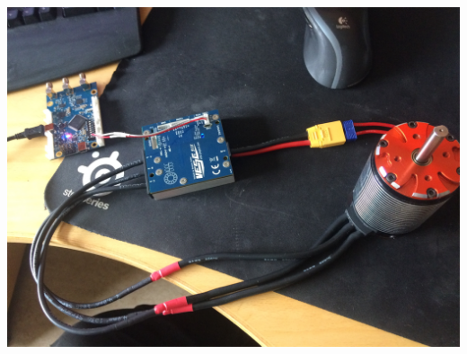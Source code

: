\documentclass[12pt]{article} %
\begin{document}
\begin{minipage}{0.33\textwidth}
  \noindent \includegraphics[width=\textwidth]{./photos/VESC_RTK.JPG}
\end{minipage}


\vspace{5mm}
\end{document}

